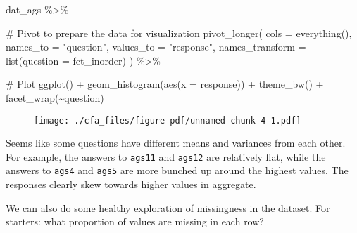 \documentclass[
  letterpaper,
  DIV=11,
  numbers=noendperiod]{scrreprt}
\newenvironment{Shaded}{\begin{snugshade}}{\end{snugshade}}
\newcommand{\AttributeTok}[1]{\textcolor[rgb]{0.40,0.45,0.13}{#1}}
\newcommand{\CommentTok}[1]{\textcolor[rgb]{0.37,0.37,0.37}{#1}}
\newcommand{\FunctionTok}[1]{\textcolor[rgb]{0.28,0.35,0.67}{#1}}
\newcommand{\NormalTok}[1]{\textcolor[rgb]{0.00,0.23,0.31}{#1}}
\newcommand{\SpecialCharTok}[1]{\textcolor[rgb]{0.37,0.37,0.37}{#1}}
\newcommand{\StringTok}[1]{\textcolor[rgb]{0.13,0.47,0.30}{#1}}
\begin{document}
\begin{Shaded}
\begin{Highlighting}[]
\NormalTok{dat\_ags }\SpecialCharTok{\%\textgreater{}\%} 

  \CommentTok{\# Pivot to prepare the data for visualization}
  \FunctionTok{pivot\_longer}\NormalTok{(}
    \AttributeTok{cols      =} \FunctionTok{everything}\NormalTok{(),}
    \AttributeTok{names\_to  =} \StringTok{"question"}\NormalTok{,}
    \AttributeTok{values\_to =} \StringTok{"response"}\NormalTok{,}
    \AttributeTok{names\_transform =} \FunctionTok{list}\NormalTok{(}\AttributeTok{question =}\NormalTok{ fct\_inorder)  }
\NormalTok{  ) }\SpecialCharTok{\%\textgreater{}\%} 

  \CommentTok{\# Plot}
  \FunctionTok{ggplot}\NormalTok{() }\SpecialCharTok{+}
  \FunctionTok{geom\_histogram}\NormalTok{(}\FunctionTok{aes}\NormalTok{(}\AttributeTok{x =}\NormalTok{ response)) }\SpecialCharTok{+} 
  \FunctionTok{theme\_bw}\NormalTok{() }\SpecialCharTok{+} 
  \FunctionTok{facet\_wrap}\NormalTok{(}\SpecialCharTok{\textasciitilde{}}\NormalTok{question)}
\end{Highlighting}
\end{Shaded}

\begin{figure}[H]

{\centering \texttt{[image: ./cfa\_files/figure-pdf/unnamed-chunk-4-1.pdf]}

}

\end{figure}

Seems like some questions have different means and variances from each
other. For example, the answers to \texttt{ags11} and \texttt{ags12} are
relatively flat, while the answers to \texttt{ags4} and \texttt{ags5}
are more bunched up around the highest values. The responses clearly
skew towards higher values in aggregate.

We can also do some healthy exploration of missingness in the dataset.
For starters: what proportion of values are missing in each row?
\end{document}
